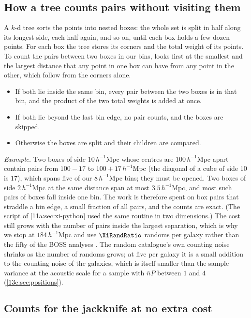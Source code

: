 \subsection{How a tree counts pairs without visiting them}
\label{13c:sec:tree}

A $k$-d tree sorts the points into nested boxes: the whole set is split in half
along its longest side, each half again, and so on, until each box holds a few dozen
points. For each box the tree stores its corners and the total weight of its points.
To count the pairs between two boxes in our bins, 
looks first at the smallest and the largest distance that any point in one box can
have from any point in the other, which follow from the corners alone.
\begin{itemize}[itemsep=1pt,leftmargin=1.2em]
  \item If both lie inside the same bin, every pair between the two boxes is in that
        bin, and the product of the two total weights is added at once.
  \item If both lie beyond the last bin edge, no pair counts, and the boxes are
        skipped.
  \item Otherwise the boxes are split and their children are compared.
\end{itemize}
\emph{Example.} Two boxes of side $10\,h^{-1}$Mpc whose centres are $100\,h^{-1}$Mpc
apart contain pairs from $100-17$ to $100+17\,h^{-1}$Mpc (the diagonal of a cube of
side $10$ is $17$), which spans five of our $8\,h^{-1}$Mpc bins; they must be opened.
Two boxes of side $2\,h^{-1}$Mpc at the same distance span at most $3.5\,h^{-1}$Mpc,
and most such pairs of boxes fall inside one bin. The work is therefore spent on box
pairs that straddle a bin edge, a small fraction of all pairs, and the counts are
exact. (The script of \cref{11a:sec:xi-python} used the same routine in two
dimensions.) The cost still grows with the number of pairs inside the largest
separation, which is why we stop at $184\,h^{-1}$Mpc and use $\XiRandRatio$ randoms
per galaxy rather than the fifty of the BOSS analyses \cite{Cuesta2016}. The random
catalogue's own counting noise shrinks as the number of randoms grows; at five per
galaxy it is a small addition to the counting noise of the galaxies, which is itself
smaller than the sample variance at the acoustic scale for a sample with $\bar nP$
between $1$ and $4$ (\cref{13c:sec:positions}).

\subsection{Counts for the jackknife at no extra cost}
\label{13c:sec:leave-one-out}


